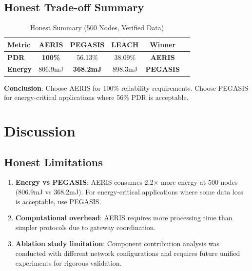 \documentclass[twocolumn]{article}
\begin{document}

\subsection{Honest Trade-off Summary}

\begin{table}[htbp]
\centering
\caption{Honest Summary (500 Nodes, Verified Data)}
\label{tab:honest}
\begin{tabular}{@{}lccccc@{}}
\toprule
Metric & AERIS & PEGASIS & LEACH & Winner \\
\midrule
\textbf{PDR} & \textbf{100\%} & 56.13\% & 38.09\% & \textbf{AERIS} \\
\textbf{Energy} & 806.9mJ & \textbf{368.2mJ} & 898.3mJ & \textbf{PEGASIS} \\
\bottomrule
\end{tabular}
\end{table}

\textbf{Conclusion}: Choose AERIS for 100\% reliability requirements.
Choose PEGASIS for energy-critical applications where 56\% PDR is acceptable.

\section{Discussion}
\label{sec:discussion}

\subsection{Honest Limitations}

\begin{enumerate}
    \item \textbf{Energy vs PEGASIS}: AERIS consumes 2.2$\times$ more energy
    at 500 nodes (806.9mJ vs 368.2mJ). For energy-critical applications
    where some data loss is acceptable, use PEGASIS.

    \item \textbf{Computational overhead}: AERIS requires more processing
    time than simpler protocols due to gateway coordination.

    \item \textbf{Ablation study limitation}: Component contribution analysis
    was conducted with different network configurations and requires future
    unified experiments for rigorous validation.
\end{enumerate}
\end{document}
